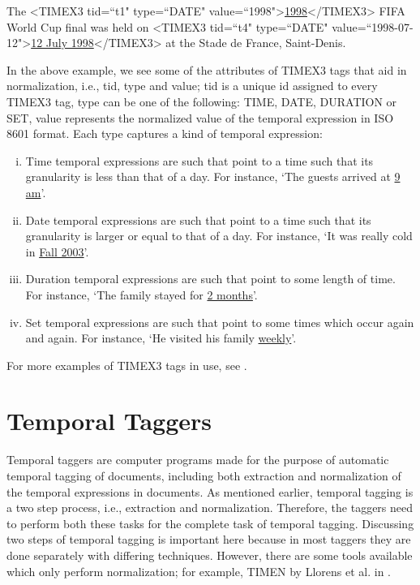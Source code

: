 \begin{mdframed}[style=MyFrame]
	\sloppy
	The <TIMEX3 tid=``t1" type=``DATE" value=``1998">\ul{1998}</TIMEX3> FIFA World Cup final was held on <TIMEX3 tid=``t4" type=``DATE" value=``1998-07-12">\ul{12 July 1998}</TIMEX3> at the Stade de France, Saint-Denis.
\end{mdframed}

In the above example, we see some of the attributes of TIMEX3 tags that aid in normalization, i.e., tid, type and value; tid is a unique id assigned to every TIMEX3 tag, type can be one of the following: TIME, DATE, DURATION or SET, value represents the normalized value of the temporal expression in ISO 8601 format. Each type captures a kind of temporal expression:

\begin{enumerate}[i.] \label{ss2as:timeml}
	\item Time temporal expressions are such that point to a time such that its granularity is less than that of a day. For instance, `The guests arrived at \ul{9 am}'.
	\item Date temporal expressions are such that point to a time such that its granularity is larger or equal to that of a day. For instance, `It was really cold in \ul{Fall 2003}'. 
	\item Duration temporal expressions are such that point to some length of time. For instance, `The family stayed for \ul{2 months}'.
	\item Set temporal expressions are such that point to some times which occur again and again. For instance, `He visited his family \ul{weekly}'.
\end{enumerate}
For more examples of TIMEX3 tags in use, see \cite{sauri2006timeml, timeml2009guidelines}.\\



\section{Temporal Taggers}
Temporal taggers are computer programs made for the purpose of automatic temporal tagging of documents, including both extraction and normalization of the temporal expressions in documents. As mentioned earlier, temporal tagging is a two step process, i.e., extraction and normalization. Therefore, the taggers need to perform both these tasks for the complete task of temporal tagging. Discussing two steps of temporal tagging is important here because in most taggers they are done separately with differing techniques. However, there are some tools available which only perform normalization; for example, TIMEN by Llorens et al. in \cite{DBLP:conf/lrec/LlorensDGS12}.




